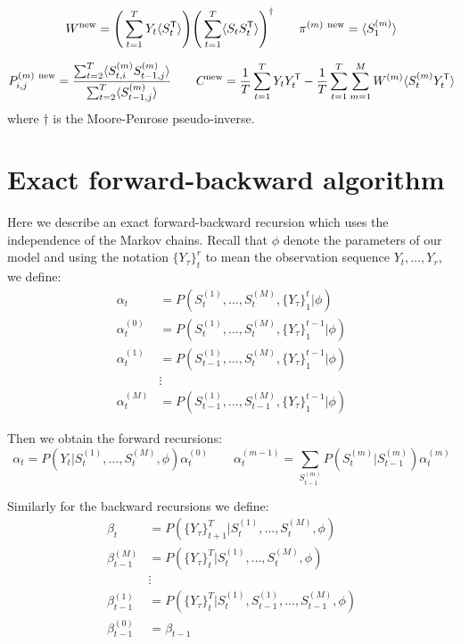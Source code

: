 \documentclass{article}
\begin{document}
\[ W^\textnormal{new} = \Bigg( \sum_{t=1}^T Y_t \langle S_{t}^\mathsf{T} \rangle \Bigg) \Bigg( \sum_{t=1}^T \langle S_{t} S_{t}^\mathsf{T} \rangle \Bigg)^\dagger \qquad \pi^{(m) \ \textnormal{new}} = \langle S_{1}^{(m)}  \rangle\]

\[ P_{i,j}^{(m) \ \textnormal{new}} = \frac{\sum_{t=2}^T \langle S_{t,i}^{(m)} S_{t-1,j}^{(m)}  \rangle}{\sum_{t=2}^T \langle S_{t-1,j}^{(m)}  \rangle} \qquad C^{\textnormal{new}} = \frac{1}{T} \sum_{t=1}^T Y_t Y_t^\mathsf{T} - \frac{1}{T} \sum_{t=1}^T \sum_{m=1}^M W^{(m)} \langle S_t^{(m)} Y_t^\mathsf{T} \rangle \]
where $\dagger$ is the Moore-Penrose pseudo-inverse.

\section{Exact forward-backward algorithm}

Here we describe an exact forward-backward recursion which uses the independence of the Markov chains. Recall that $\phi$ denote the parameters of our model and using the notation $\{ Y_\tau \}_t^r$ to mean the observation sequence $Y_t,\dots,Y_r$, we define:
\begin{align*}
\alpha_t &= P(S_t^{(1)},\dots,S_t^{(M)}, \{Y_\tau \}_1^t | \phi) \\
\alpha_t^{(0)} &= P(S_t^{(1)},\dots,S_t^{(M)}, \{Y_\tau \}_1^{t-1} | \phi) \\
\alpha_t^{(1)} &= P(S_{t-1}^{(1)},\dots,S_t^{(M)}, \{Y_\tau \}_1^{t-1} | \phi) \\
&\vdots \\
\alpha_t^{(M)} &= P(S_{t-1}^{(1)},\dots,S_{t-1}^{(M)}, \{Y_\tau \}_1^{t-1} | \phi)
\end{align*}

Then we obtain the forward recursions:
\[ \alpha_t = P(Y_t | S_t^{(1)},\dots,S_t^{(M)}, \phi) \alpha_t^{(0)} \qquad \alpha_t^{(m-1)} = \sum_{S_{t-1}^{(m)}} P(S_t^{(m)} | S_{t-1}^{(m)}) \alpha_t^{(m)} \]

Similarly for the backward recursions we define:
\begin{align*}
\beta_t &= P(\{Y_\tau \}_{t+1}^T | S_t^{(1)},\dots,S_t^{(M)}, \phi) \\
\beta_{t-1}^{(M)} &= P(\{Y_\tau \}_{t}^T | S_t^{(1)},\dots,S_t^{(M)}, \phi) \\
&\vdots \\ 
\beta_{t-1}^{(1)} &= P(\{Y_\tau \}_{t}^T | S_t^{(1)}, S_{t-1}^{(1)}, \dots,S_{t-1}^{(M)}, \phi) \\
\beta_{t-1}^{(0)} &= \beta_{t-1}
\end{align*}
\end{document}
